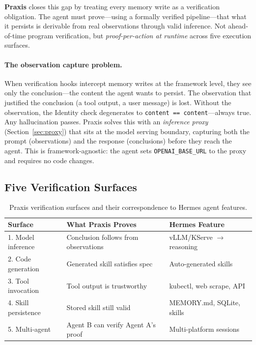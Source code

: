 \documentclass[sigplan,screen,nonacm]{acmart}
\begin{document}
\textbf{Praxis} closes this gap by treating every memory write as a
verification obligation. The agent must prove---using a formally verified
pipeline---that what it persists is derivable from real observations through
valid inference. Not ahead-of-time program verification, but
\emph{proof-per-action at runtime} across five execution surfaces.

\paragraph{The observation capture problem.}
When verification hooks intercept memory writes at the framework level, they
see only the conclusion---the content the agent wants to persist. The
observation that justified the conclusion (a tool output, a user message) is
lost. Without the observation, the Identity check degenerates to
\texttt{content == content}---always true. Any hallucination passes. Praxis
solves this with an \emph{inference proxy} (Section~\ref{sec:proxy}) that
sits at the model serving boundary, capturing both the prompt (observations)
and the response (conclusions) before they reach the agent. This is
framework-agnostic: the agent sets \texttt{OPENAI\_BASE\_URL} to the proxy
and requires no code changes.

\subsection{Five Verification Surfaces}

\begin{table}[t]
\caption{Praxis verification surfaces and their correspondence to Hermes agent features.}
\label{tab:surfaces}
\small
\begin{tabular}{@{}lll@{}}
\toprule
\textbf{Surface} & \textbf{What Praxis Proves} & \textbf{Hermes Feature} \\
\midrule
1. Model inference & Conclusion follows from observations & vLLM/KServe $\to$ reasoning \\
2. Code generation & Generated skill satisfies spec & Auto-generated skills \\
3. Tool invocation & Tool output is trustworthy & kubectl, web scrape, API \\
4. Skill persistence & Stored skill still valid & MEMORY.md, SQLite, skills \\
5. Multi-agent & Agent B can verify Agent A's proof & Multi-platform sessions \\
\bottomrule
\end{tabular}
\end{table}
\end{document}
